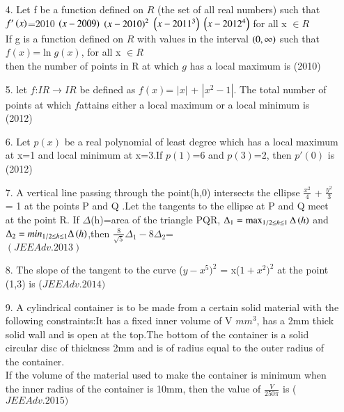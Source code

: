 \documentclass[journal,12pt,twocolumn]{IEEEtran}
\theoremstyle{remark}
\begin{document}
																				 \begin{enumerate}
																				 \item[4.] Let f be a function defined on $R$ (the set of all real numbers) such that $f'\left(x\right)$=2010 $\left(x-2009\right)$ $\left(x-2010\right)^2$ $\left(x-2011^3\right)$ $\left(x-2012^4\right)$ for all x $\in R$ \\ If g is a function defined on $R$ with values in the interval $\left(0,\infty\right)$ such that \\

																				 \hspace{1cm}  $f(x)$=$\ln{g(x)}$, for all x $\in R$\\ then the number of points in R at which $g$ has a local maximum is \hfill (2010)\\
																				 \item[5.] let $f$:$IR \rightarrow IR$ be defined as $f(x)$= $|x|$ + $|x^2-1|$. The total number of points at which $f$attains either a local maximum or a local minimum is\\ \hfill (2012) \\
																				 \item[6.]Let $p(x)$ be a real polynomial of least degree which has a local maximum at x=1 and local minimum at x=3.If $p(1)$=6 and $p(3)$=2, then $p'(0)$ is \hfill (2012) \\
																				 \item[7.]A vertical line passing through the point(h,0) intersects the ellipse $\frac{x^2}{4}$ + $\frac{y^2}{3}$ = 1 at the points P and Q .Let the tangents to the ellipse at P and Q meet at the point R. If $\Delta$(h)=area of the triangle PQR, $\Delta_1  = \max _{1/2\leq h \leq 1}\Delta\left(h\right)$ and $\Delta_2 = min_{1/2\leq h \leq 1}\Delta\left(h\right)$,then $\frac{8}{\sqrt{5}}\Delta_1 - 8\Delta_2$=\\\hfill $(JEEAdv.2013)$\\
																				 \item[8.]The slope of the tangent to the curve ($y-x^5)^2$ = x($1+x^2)^2$ at the point (1,3) is \hfill ($JEE Adv. 2014)$ \\
																				 \item[9.]A cylindrical container is to be made from a certain solid material with the following constraints:It has a fixed inner volume of V $mm^3$, has a 2mm thick solid wall and is open at the top.The bottom of the container is a solid circular disc of thickness 2mm and is of radius equal to the outer radius of the container.\\If the volume of the material used to make the container is minimum when the inner radius of the container is 10mm, then the value of $\frac{V}{250\pi}$ is \hfill ($JEE Adv. 2015)$ \\  
																				 \end{enumerate}
																				 
\end{document}
